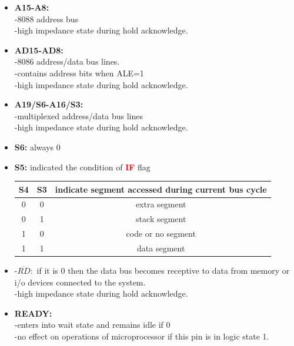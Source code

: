 \documentclass[12pt]{article}
\begin{document}
\begin{itemize}
\begin{itemize}
		\item \textbf{A15-A8:} \\
		-8088 address bus\\
		-high impedance state during hold acknowledge.
		
		\item \textbf{AD15-AD8:}\\
		-8086 address/data bus lines.\\
		-contains address bits when ALE=1\\
		-high impedance state during hold acknowledge.
		
		\item \textbf{A19/S6-A16/S3:}\\
		-multiplexed address/data bus lines\\
		-high impedance state during hold acknowledge.
		
		\item\textbf{S6:} always 0\\
		\item\textbf{S5:} indicated the condition of \textbf{\textcolor{red}{IF}} flag\\
		
		\begin{table}[H]
			\centering
			\begin{tabular}{|c|c|c|}
				\hline
				S4 & S3 & indicate segment accessed  during current bus cycle\\\hline
				
				0 & 0 & extra segment\\\hline
				0 & 1 & stack segment\\\hline
				1 & 0 & code or no segment\\\hline
				1 & 1 & data segment\\\hline
			\end{tabular}
		\end{table}
	
		\item -$\overline{RD}:$ if it is 0 then the data bus becomes receptive to data from memory or i/o devices connected to the system.\\
		-high impedance state during hold acknowledge.
		
		\item\textbf{READY:}\\
		-enters into wait state and remains idle if 0\\
		-no effect on operations of microprocessor if this pin is in logic state 1.
		

\end{itemize}
\end{itemize}
\end{document}
